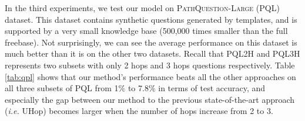 \begin{table}[h]\centering
{}
\caption{\fontsize{10}{12}\selectfont We report set accuracy ($\%$) on PQL. Similar to Table \ref{tab:wqsp_cwq}, we use $*$ to highlight the methods which only requires the answer as supervision.}\label{tab:qpl}
\end{table}

In the third experiments, we test our model on \textsc{PathQuestion-Large} (PQL) dataset. This dataset contains synthetic questions generated by templates, and is supported by a very small knowledge base (500,000 times smaller than the full freebase). Not surprisingly, we can see the average performance on this dataset is much better than it is on the other two datasets. Recall that PQL2H and PQL3H represents two subsets with only 2 hops and 3 hops questions respectively. Table \ref{tab:qpl} shows that our method's performance beats all the other approaches on all three subsets of PQL from 1$\%$ to 7.8$\%$ in terms of test accuracy, and especially the gap between our method to the previous state-of-the-art approach (\emph{i.e.} UHop) becomes larger when the number of hops increase from 2 to 3. 





 

